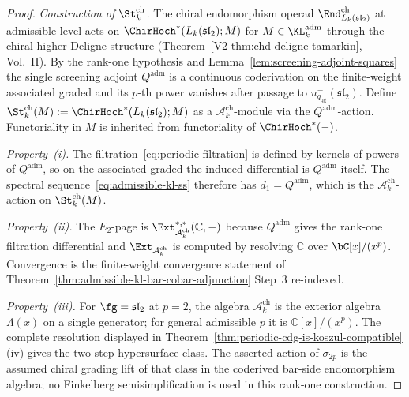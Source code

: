 \begin{proof}
\emph{Construction of $\St^{\mathrm{ch}}_k$.}
The chiral endomorphism operad
$\End^{\mathrm{ch}}_{L_k(\mathfrak{sl}_2)}$ at admissible level acts on
$\ChirHoch^*(L_k(\mathfrak{sl}_2); M)$ for
$M \in \KL_k^{\mathrm{adm}}$
through the chiral higher Deligne structure
\textup{(}Theorem~\ref{V2-thm:chd-deligne-tamarkin}, Vol.~II\textup{)}.
By the rank-one hypothesis and Lemma~\ref{lem:screening-adjoint-squares}
the single screening adjoint $Q^{\mathrm{adm}}$ is a continuous
coderivation on the finite-weight associated graded and its
$p$-th power vanishes after passage to
$u_{q_{\mathrm{qg}}}^-(\mathfrak{sl}_2)$.
Define
$\St^{\mathrm{ch}}_k(M) := \ChirHoch^*(L_k(\mathfrak{sl}_2); M)$
as a $\mathcal{A}^{\mathrm{ch}}_k$-module via the
$Q^{\mathrm{adm}}$-action. Functoriality in $M$ is inherited
from functoriality of $\ChirHoch^*(-)$.

\emph{Property~(i).}
The filtration~\eqref{eq:periodic-filtration} is defined by
kernels of powers of $Q^{\mathrm{adm}}$, so on the associated
graded the induced differential is $Q^{\mathrm{adm}}$ itself.
The spectral sequence~\eqref{eq:admissible-kl-ss} therefore has
$d_1 = Q^{\mathrm{adm}}$, which is the
$\mathcal{A}^{\mathrm{ch}}_k$-action on $\St^{\mathrm{ch}}_k(M)$.

\emph{Property~(ii).}
The $E_2$-page is
$\Ext^{*,*}_{\mathcal{A}^{\mathrm{ch}}_k}(\mathbb{C}, -)$ because
$Q^{\mathrm{adm}}$ gives the rank-one filtration differential and
$\Ext_{\mathcal{A}^{\mathrm{ch}}_k}$ is computed by resolving
$\mathbb{C}$ over $\bC[x]/(x^p)$.  Convergence is the finite-weight
convergence statement of
Theorem~\ref{thm:admissible-kl-bar-cobar-adjunction} Step~3
re-indexed.

\emph{Property~(iii).}
For $\fg = \mathfrak{sl}_2$ at $p = 2$, the algebra
$\mathcal{A}^{\mathrm{ch}}_k$ is the exterior algebra
$\Lambda(x)$ on a single generator; for general admissible $p$ it
is $\mathbb{C}[x]/(x^p)$.  The complete resolution displayed in
Theorem~\ref{thm:periodic-cdg-is-koszul-compatible}(iv) gives the
two-step hypersurface class.  The asserted action of $\sigma_{2p}$ is
the assumed chiral grading lift of that class in the coderived
bar-side endomorphism algebra; no Finkelberg
semisimplification is used in this rank-one construction.
\end{proof}

